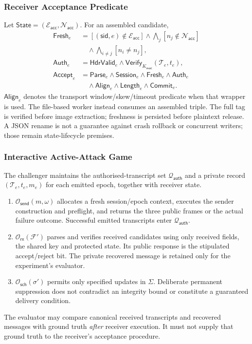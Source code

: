\documentclass[journal]{IEEEtran}
\theoremstyle{definition}
\theoremstyle{game}
\begin{document}
\subsubsection{Receiver Acceptance Predicate}
Let $\mathsf{State}=(\mathcal E_{\mathsf{acc}},\mathcal N_{\mathsf{acc}})$.
For an assembled candidate,
\begin{align}
\mathsf{Fresh}_e
&=[(\mathsf{sid},e)\notin\mathcal E_{\mathsf{acc}}]
\wedge\bigwedge_j[n_j\notin\mathcal N_{\mathsf{acc}}]\nonumber\\
&\quad\wedge\bigwedge_{i\ne j}[n_i\ne n_j],\\
\mathsf{Auth}_e
&=\mathsf{HdrValid}_e\wedge
\mathsf{Verify}_{K_{\mathsf{mac}}}(\mathcal T_e,t_e),\\
\mathsf{Accept}_e
&=\mathsf{Parse}_e\wedge\mathsf{Session}_e\wedge\mathsf{Fresh}_e
\wedge\mathsf{Auth}_e\nonumber\\
&\quad\wedge\mathsf{Align}_e\wedge\mathsf{Length}_e\wedge\mathsf{Commit}_e.
\end{align}
$\mathsf{Align}_e$ denotes the transport window/skew/timeout predicate when
that wrapper is used. The file-based worker instead consumes an assembled
triple. The full tag is verified before image extraction; freshness is
persisted before plaintext release. A JSON rename is not a guarantee against
crash rollback or concurrent writers; those remain state-lifecycle premises.

\subsubsection{Interactive Active-Attack Game}
The challenger maintains the authorised-transcript set
$\mathcal Q_{\mathsf{auth}}$ and a private record
$(\mathcal T_e,t_e,m_e)$ for each emitted epoch, together with receiver state.
\begin{enumerate}[label=(\arabic*),leftmargin=1.7em]
\item $\mathcal O_{\mathsf{send}}(m,\omega)$ allocates a fresh session/epoch
context, executes the sender construction and preflight, and returns the
three public frames or the actual failure outcome. Successful emitted
transcripts enter $\mathcal Q_{\mathsf{auth}}$.
\item $\mathcal O_{\mathsf{rx}}(\mathcal F')$ parses and verifies received
candidates using only received fields, the shared key and protected state.
Its public response is the stipulated accept/reject bit. The private
recovered message is retained only for the experiment's evaluator.
\item $\mathcal O_{\mathsf{sch}}(\sigma')$ permits only specified updates
in $\Sigma$. Deliberate permanent suppression does not contradict an
integrity bound or constitute a guaranteed delivery condition.
\end{enumerate}
The evaluator may compare canonical received transcripts and recovered
messages with ground truth \emph{after} receiver execution. It must not supply
that ground truth to the receiver's acceptance procedure.
\end{document}
